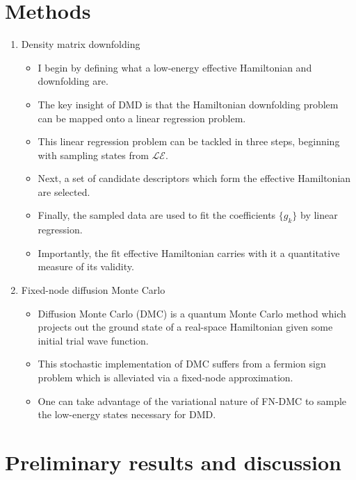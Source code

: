 \documentclass{article}
\begin{document}
\section{Methods}
\begin{enumerate}
\item Density matrix downfolding
\begin{itemize}
\item I begin by defining what a low-energy effective Hamiltonian and downfolding are.

\item The key insight of DMD is that the Hamiltonian downfolding problem can be mapped onto a linear regression problem.

\item This linear regression problem can be tackled in three steps, beginning with sampling states from $\mathcal{LE}$.

\item Next, a set of candidate descriptors which form the effective Hamiltonian are selected.

\item Finally, the sampled data are used to fit the coefficients $\{g_k\}$ by linear regression.

\item Importantly, the fit effective Hamiltonian carries with it a quantitative measure of its validity.
\end{itemize}

\item Fixed-node diffusion Monte Carlo 
\begin{itemize}
\item Diffusion Monte Carlo (DMC) is a quantum Monte Carlo method which projects out the ground state of a real-space Hamiltonian given some initial trial wave function.

\item This stochastic implementation of DMC suffers from a fermion sign problem which is alleviated via a fixed-node approximation.

\item One can take advantage of the variational nature of FN-DMC to sample the low-energy states necessary for DMD.
\end{itemize}
\end{enumerate}

\section{Preliminary results and discussion}
\end{document}

